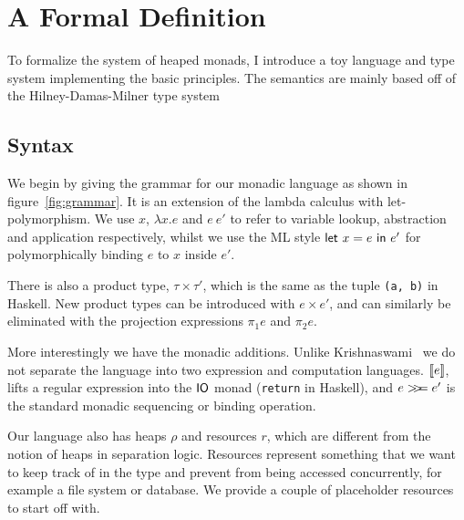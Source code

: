 \chapter{A Formal Definition} \label{chapter:system}

To formalize the system of heaped monads, I introduce a toy language
and type system implementing the basic principles. The semantics are
mainly based off of the Hilney-Damas-Milner type system \cite{damasmilner}

\section{Syntax}

\setlength{\grammarparsep}{20pt plus 1pt minus 1pt} %
\setlength{\grammarindent}{12em} %
\renewcommand{\syntleft}{}
\renewcommand{\syntright}{}



\def\defaultHypSeparation{\hskip .05in}

We begin by giving the grammar for our monadic language as shown in
figure~\ref{fig:grammar}.  It is an extension of the lambda calculus
with let-polymorphism.  We use $x$, $\lambda x . e$ and $e \ e'$ to refer to
variable lookup, abstraction and application respectively, whilst we
use the ML style $\mathsf{let} \ x = e \ \mathsf{in} \ e'$ for polymorphically binding $e$
to $x$ inside $e'$.

There is also a product type, $\tau \times \tau'$, which is the same as the tuple
\texttt{(a, b)} in Haskell. New product types can be introduced with
$e \times e'$, and can similarly be eliminated with the projection
expressions $\pi_1 e$ and $\pi_2 e$.

More interestingly we have the monadic additions. Unlike
Krishnaswami~\cite{krishnaswami2006} we do not separate the language
into two expression and computation languages.  $[\![ e]\!]$, lifts a
regular expression into the $\mathsf{IO}$ monad (\texttt{return} in Haskell), and
$e >\!\!>\!\!= e'$ is the standard monadic sequencing or binding operation.

Our language also has heaps $\rho$ and resources $r$, which are different from the
notion of heaps in separation logic. Resources represent something
that we want to keep track of in the type and prevent from being
accessed concurrently, for example a file system or database. We
provide a couple of placeholder resources to start off with.


